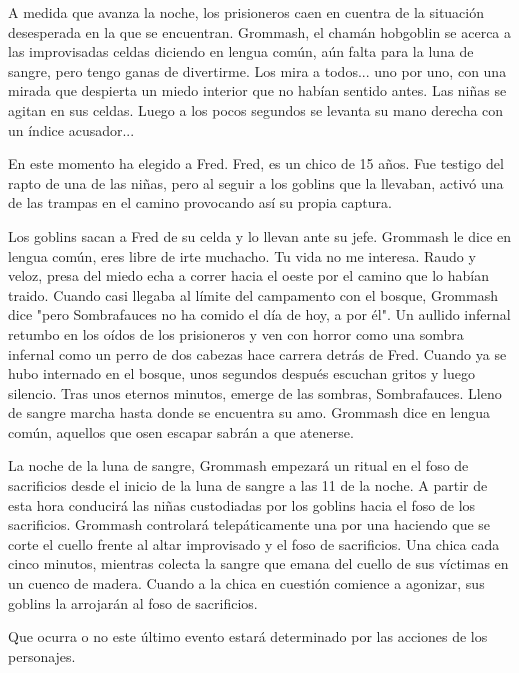 \documentclass[10pt,twoside,twocolumn,openany]{dndbook}
\begin{document}
\begin{DndReadAloud}
  A medida que avanza la noche, los prisioneros caen en cuentra de la situación desesperada en la que 
  se encuentran. Grommash, el chamán hobgoblin se acerca a las improvisadas celdas diciendo en lengua 
  común, aún falta para la luna de sangre, pero tengo ganas de divertirme. Los mira a todos... 
  uno por uno, con una mirada que despierta un miedo interior que no habían sentido antes. Las niñas 
  se agitan en sus celdas. Luego a los pocos segundos se levanta su mano derecha con un índice acusador...
\end{DndReadAloud}

En este momento ha elegido a Fred. Fred, es un chico de 15 años. Fue testigo del rapto de una de las 
niñas, pero al seguir a los goblins que la llevaban, activó una de las trampas en el camino provocando 
así su propia captura.

\begin{DndReadAloud}
Los goblins sacan a Fred de su celda y lo llevan ante su jefe. Grommash le dice en lengua común, eres 
libre de irte muchacho. Tu vida no me interesa. Raudo y veloz, presa del miedo echa a correr hacia el 
oeste por el camino que lo habían traido. Cuando casi llegaba al límite del campamento con el bosque, 
Grommash dice "pero Sombrafauces no ha comido el día de hoy, a por él". Un aullido infernal retumbo 
en los oídos de los prisioneros y ven con horror como una sombra infernal como un perro de dos cabezas 
hace carrera detrás de Fred. Cuando ya se hubo internado en el bosque, unos segundos después escuchan 
gritos y luego silencio. Tras unos eternos minutos, emerge de las sombras, Sombrafauces. Lleno de sangre 
marcha hasta donde se encuentra su amo. Grommash dice en lengua común, aquellos que osen escapar 
sabrán a que atenerse.
\end{DndReadAloud}

La noche de la luna de sangre, Grommash empezará un ritual en el foso de sacrificios desde el inicio de la 
luna de sangre a las 11 de la noche. A partir de esta hora conducirá las niñas custodiadas por los 
goblins hacia el foso de los sacrificios. Grommash controlará telepáticamente una por una haciendo 
que se corte el cuello frente al altar improvisado y el foso de sacrificios. Una chica cada cinco minutos, 
mientras colecta la sangre que emana del cuello de sus víctimas en un cuenco de madera. Cuando a la chica 
en cuestión comience a agonizar, sus goblins la arrojarán al foso de sacrificios.

Que ocurra o no este último evento estará determinado por las acciones de los personajes.
\end{document}
